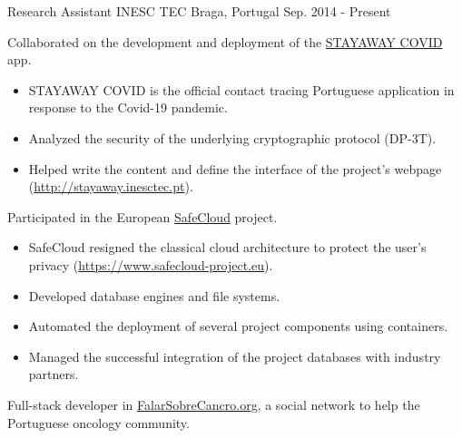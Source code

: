 

\begin{cventries}

  \cventry
    {Research Assistant} %
    {INESC TEC} %
    {Braga, Portugal} %
    {Sep. 2014 - Present} %
    {
      \begin{cvitems} %
        \item {Collaborated on the development and deployment of the \href{https://stayaway.inesctec.pt}{STAYAWAY COVID} app.}
        \begin{itemize}
          \item STAYAWAY COVID is the official contact tracing Portuguese application in response to the Covid-19 pandemic.
          \item Analyzed the security of the underlying cryptographic protocol (DP-3T).
          \item Helped write the content and define the interface of the project's webpage (\href{http://stayaway.inesctec.pt}{http://stayaway.inesctec.pt}).
        \end{itemize}
        \item{Participated in the European \href{https://www.safecloud-project.eu}{SafeCloud} project.}
        \begin{itemize}
          \item SafeCloud resigned the classical cloud architecture to protect the user's privacy (\href{https://www.safecloud-project.eu}{https://www.safecloud-project.eu}).
          \item Developed database engines and file systems.
          \item Automated the deployment of several project components using containers.
          \item Managed the successful integration of the project databases with industry partners.
        \end{itemize}
        \item{Full-stack developer in \href{https://falarsobrecancro.org}{FalarSobreCancro.org}, a social network to help the Portuguese oncology community.}

\end{cvitems}}
\end{cventries}
